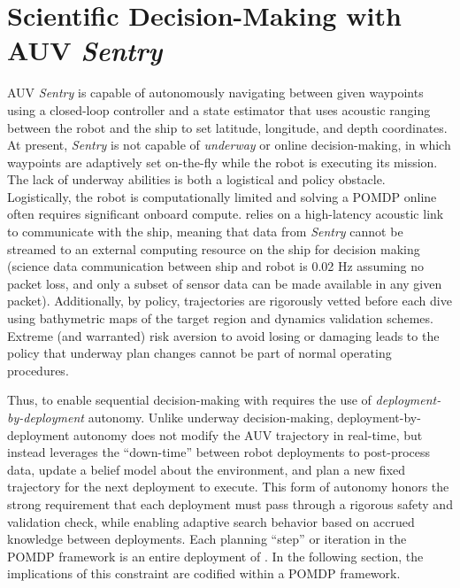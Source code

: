\section{Scientific Decision-Making with AUV \emph{Sentry}}
AUV \emph{Sentry} is capable of autonomously navigating between given waypoints using a closed-loop controller and a state estimator that uses acoustic ranging between the robot and the ship to set latitude, longitude, and depth coordinates. At present, \emph{Sentry} is not capable of \emph{underway} or online decision-making, in which waypoints are adaptively set on-the-fly while the robot is executing its mission. The lack of underway abilities is both a logistical and policy obstacle. Logistically, the robot is computationally limited and solving a POMDP online often requires significant onboard compute. \Sentry relies on a high-latency acoustic link to communicate with the ship, meaning that data from \emph{Sentry} cannot be streamed to an external computing resource on the ship for decision making (science data communication between ship and robot is 0.02 Hz assuming no packet loss, and only a subset of sensor data can be made available in any given packet). Additionally, by policy, \Sentry trajectories are rigorously vetted before each dive using bathymetric maps of the target region and dynamics validation schemes. Extreme (and warranted) risk aversion to avoid losing or damaging \Sentry leads to the policy that underway plan changes cannot be part of normal operating procedures.

Thus, to enable sequential decision-making with \Sentry requires the use of \emph{deployment-by-deployment} autonomy. Unlike underway decision-making, deployment-by-deployment autonomy does not modify the AUV trajectory in real-time, but instead leverages the ``down-time'' between robot deployments to post-process data, update a belief model about the environment, and plan a new fixed trajectory for the next deployment to execute. This form of autonomy honors the strong requirement that each deployment must pass through a rigorous safety and validation check, while enabling adaptive search behavior based on accrued knowledge between deployments. Each planning ``step'' or iteration in the POMDP framework is an entire deployment of \Sentry. In the following section, the implications of this constraint are codified within a POMDP framework.


